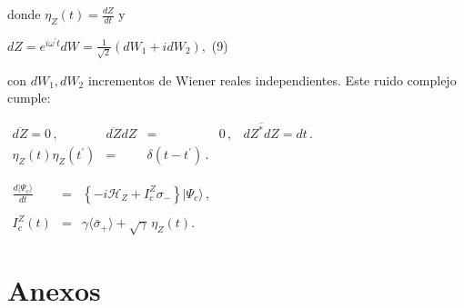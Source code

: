 \documentclass[12pt]{report}
\begin{document}
\begin{enumerate}
donde $\eta_{Z}(t)=\frac{dZ}{dt}$ y

$dZ=e^{i\omega^{\prime}t}dW=\frac{1}{\sqrt{2}}(dW_{1}+idW_{2}),$ (9)

con $dW_{1},dW_{2}$ incrementos de Wiener reales independientes. Este ruido complejo cumple:

$\begin{array}{rcl}\overline{dZ}=0\,,&\overline{dZ}dZ&=&0\,,&\overline{dZ^{*}dZ}=dt\,.\\ \eta_{Z}(t)\eta_{Z}(t^{\prime})&=&\delta(t-t^{\prime})\,.\end{array}$ 

$\begin{array}{rcl}\frac{d|\Psi_{c}\rangle}{dt}&=&\left\{ -i\mathcal{H}_{Z}+I_{c}^{Z}\sigma_{-}\right\}|\Psi_{c}\rangle\,,\\ \\ I_{c}^{Z}(t)&=&\gamma\langle\bar{\sigma}_{+}\rangle+\sqrt{\gamma}\,\eta_{Z}(t).\end{array}$

\end{enumerate}
\newpage
\section*{Anexos}
\end{document}
